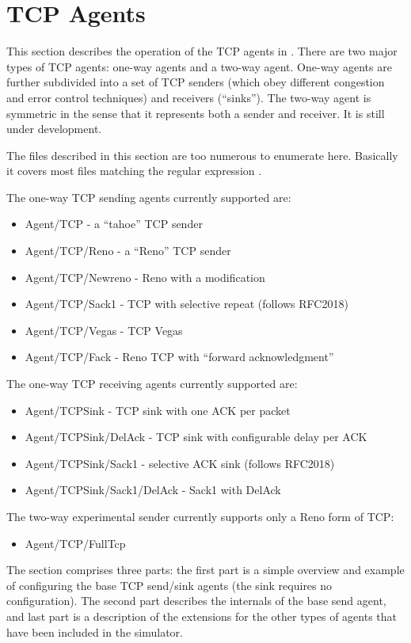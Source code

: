\chapter{TCP Agents}
\label{sec:tcpAgents}

This section describes the operation of the TCP agents in \ns.
There are two major types of TCP agents: one-way agents
and a two-way agent.
One-way agents are further subdivided into a set of TCP senders
(which obey different congestion and error control techniques)
and receivers (``sinks'').
The two-way agent is symmetric in the sense that it represents
both a sender and receiver.
It is still under development.

The files described in this section are too numerous to enumerate here.
Basically it covers most files matching the regular expression
.

The one-way TCP sending agents currently supported are:
\begin{itemize}\itemsep0pt
        \item Agent/TCP - a ``tahoe'' TCP sender
        \item Agent/TCP/Reno - a ``Reno'' TCP sender
        \item Agent/TCP/Newreno - Reno with a modification
        \item Agent/TCP/Sack1 - TCP with selective repeat (follows RFC2018)
        \item Agent/TCP/Vegas - TCP Vegas
        \item Agent/TCP/Fack - Reno TCP with ``forward acknowledgment''
\end{itemize}
The one-way TCP receiving agents currently supported are:
\begin{itemize}\itemsep0pt
        \item Agent/TCPSink - TCP sink with one ACK per packet
        \item Agent/TCPSink/DelAck - TCP sink with configurable delay per ACK
        \item Agent/TCPSink/Sack1 - selective ACK sink (follows RFC2018)
        \item Agent/TCPSink/Sack1/DelAck - Sack1 with DelAck
\end{itemize}
The two-way experimental sender currently supports only a Reno form of TCP:
\begin{itemize}
        \item Agent/TCP/FullTcp
\end{itemize}

The section comprises three parts:
the first part is a simple overview and example of configuring
the base TCP send/sink agents (the sink requires no configuration).
The second part describes the internals of the base send agent,
and last part is a description of the extensions
for the other types of agents that have been included in the
simulator.

